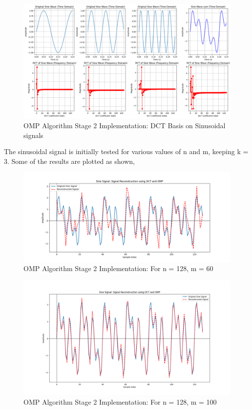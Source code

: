 \documentclass[
  letterpaper,
  DIV=11,
  numbers=noendperiod]{scrartcl}
\begin{document}
\begin{figure}[H]

{\centering \includegraphics[width=0.8\linewidth,height=\textheight,keepaspectratio]{abar-cs_files/mediabag/sine-dct.png}

}

\caption{OMP Algorithm Stage 2 Implementation: DCT Basis on Sinusoidal
signals}

\end{figure}%

The sinusoidal signal is initially tested for various values of n and m,
keeping k = 3. Some of the results are plotted as shown,

\begin{figure}[H]

{\centering \includegraphics[width=0.8\linewidth,height=\textheight,keepaspectratio]{abar-cs_files/mediabag/omp-sine-n128-m60.png}

}

\caption{OMP Algorithm Stage 2 Implementation: For n = 128, m = 60}

\end{figure}%

\begin{figure}[H]

{\centering \includegraphics[width=0.8\linewidth,height=\textheight,keepaspectratio]{abar-cs_files/mediabag/omp-sine-n128-m100.png}

}

\caption{OMP Algorithm Stage 2 Implementation: For n = 128, m = 100}

\end{figure}%
\end{document}
